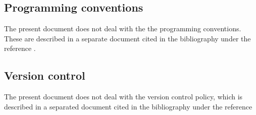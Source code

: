 \subsection{Programming conventions}

The present document does not deal with the the programming conventions. These are described in a separate document cited in the bibliography under the reference \cite{OTprog}.

\subsection{Version control}

The present document does not deal with the version control policy, which is described in a separated document cited in the bibliography under the reference \cite{OTpgcl}

